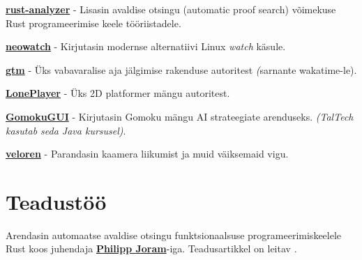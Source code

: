 \documentclass[]{deedy-resume-openfont}
\begin{document}
\begin{minipage}[t]{0.66\textwidth}
\begin{tightitemize}
  \item \textbf{\href{https://github.com/rust-lang/rust-analyzer}{rust-analyzer}} - Lisasin avaldise otsingu (automatic proof search) võimekuse Rust programeerimise keele tööriistadele.
  \item \textbf{\href{https://github.com/kilpkonn/neowatch}{neowatch}} - Kirjutasin modernse alternatiivi Linux \textit{watch} käsule.
  \item \textbf{\href{https://github.com/DEVELOPEST}{gtm}} - Üks vabavaralise aja jälgimise rakenduse autoritest \textit(sarnante wakatime-le).
  \item \textbf{\href{https://github.com/kilpkonn/LonePlayer}{LonePlayer}} - Üks 2D platformer mängu autoritest.
  \item \textbf{\href{https://github.com/kilpkonn/GomokuGUI}{GomokuGUI}} - Kirjutasin Gomoku mängu AI strateegiate arenduseks. \textit{(TalTech kasutab seda Java kursusel)}.
  \item \textbf{\href{https://veloren.net/}{veloren}} - Parandasin kaamera liikumist ja muid väiksemaid vigu.
\end{tightitemize}

\sectionspace %


\section{Teadustöö}


Arendasin automaatse avaldise otsingu funktsionaalsuse programeerimiskeelele Rust koos juhendaja \textbf{\href{https://taltech.ee/en/contacts/philipp-joram}{Philipp Joram}}-iga. Teadusartikkel on leitav \cite{term-search-in-rust}.

\sectionspace %


%
%


\end{minipage}
\end{document}
